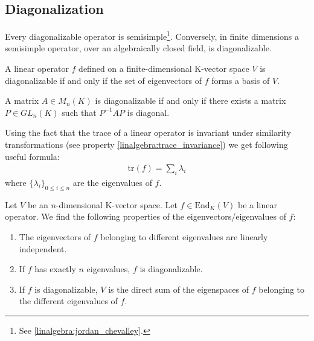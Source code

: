 \subsection{Diagonalization}

    	\begin{property}
    		Every diagonalizable operator is semisimple\footnote{See \ref{linalgebra:jordan_chevalley}.}. Conversely, in finite dimensions a semisimple operator, over an algebraically closed field, is diagonalizable.
    	\end{property}
    
    	\begin{theorem}\label{linalgebra:theorem:diagonalizable_basis}
	        A linear operator $f$ defined on a finite-dimensional K-vector space $V$ is diagonalizable if and only if the set of eigenvectors of $f$ forms a basis of $V$.
	\end{theorem}
		
        \begin{theorem}\label{linalgebra:theorem:diagonalizable_PQP}
		A matrix $A\in M_n(K)$ is diagonalizable if and only if there exists a matrix $P\in GL_n(K)$ such that $P^{-1}AP$ is diagonal.
        \end{theorem}
        \begin{result}
        	Using the fact that the trace of a linear operator is invariant under similarity transformations (see property \ref{linalgebra:trace_invariance}) we get following useful formula:
            	\begin{gather}
            		\boxed{\text{tr}(f) = \sum_i\lambda_i}
	        \end{gather}
            	where $\{\lambda_i\}_{0\leq i\leq n}$ are the eigenvalues of $f$.
        \end{result}
        
        \begin{property}\label{linalgebra:diagonalization_properties}
		Let $V$ be an $n$-dimensional K-vector space. Let $f\in \text{End}_K(V)$ be a linear operator. We find the following properties of the eigenvectors/eigenvalues of $f$:
            	\begin{enumerate}
			\item The eigenvectors of $f$ belonging to different eigenvalues are linearly independent.
                	\item If $f$ has exactly $n$ eigenvalues, $f$ is diagonalizable.
                	\item If $f$ is diagonalizable, $V$ is the direct sum of the eigenspaces of $f$ belonging to the different eigenvalues of $f$.
		\end{enumerate}
	\end{property}

